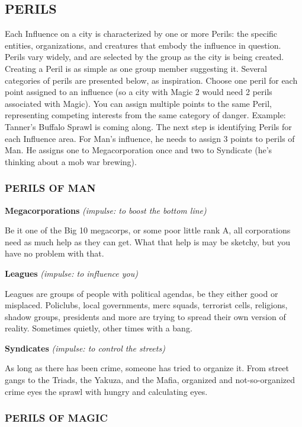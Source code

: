 \documentclass[oneside,10pt]{article}
\begin{document}
\begin{multicols}{2}
\subsection{PERILS}
Each Influence on a city is characterized by one or more Perils: the specific entities, organizations, and creatures that embody the influence in question. Perils vary widely, and are
selected by the group as the city is being created. Creating a
Peril is as simple as one group member suggesting it. Several
categories of perils are presented below, as inspiration.
Choose one peril for each point assigned to an influence (so a
city with Magic 2 would need 2 perils associated with Magic).
You can assign multiple points to the same Peril, representing
competing interests from the same category of danger.
Example: Tanner’s Buffalo Sprawl is coming along. The
next step is identifying Perils for each Influence area. For
Man’s influence, he needs to assign 3 points to perils of
Man. He assigns one to Megacorporation once and two to
Syndicate (he’s thinking about a mob war brewing).

\subsubsection{PERILS OF MAN}
\textbf{Megacorporations} \textit{(impulse: to boost the bottom line)}

Be it one of the Big 10 megacorps, or some poor little rank A,
all corporations need as much help as they can get. What that
help is may be sketchy, but you have no problem with that.

\textbf{Leagues} \textit{(impulse: to influence you)}

Leagues are groups of people with political agendas, be they
either good or misplaced. Policlubs, local governments, merc
squads, terrorist cells, religions, shadow groups, presidents
and more are trying to spread their own version of reality.
Sometimes quietly, other times with a bang.

\textbf{Syndicates} \textit{(impulse: to control the streets)}

As long as there has been crime, someone has tried to organize it. From street gangs to the Triads, the Yakuza, and the
Mafia, organized and not-so-organized crime eyes the sprawl
with hungry and calculating eyes.

\subsubsection{PERILS OF MAGIC}


\end{multicols}
\end{document}
